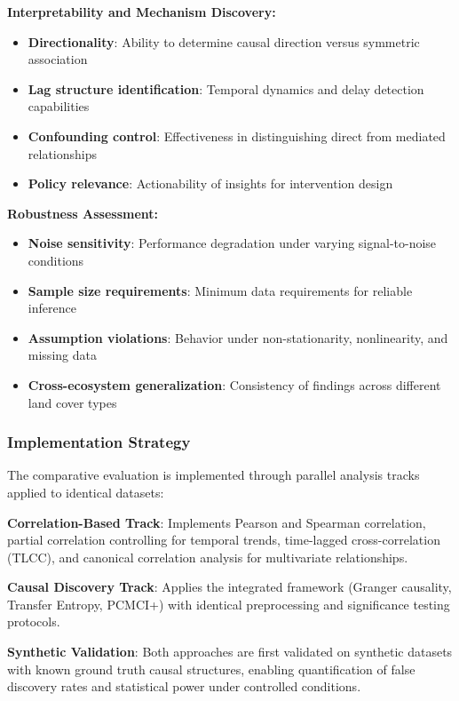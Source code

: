 \textbf{Interpretability and Mechanism Discovery:}
\begin{itemize}
	\item \textbf{Directionality}: Ability to determine causal direction versus symmetric association
	\item \textbf{Lag structure identification}: Temporal dynamics and delay detection capabilities
	\item \textbf{Confounding control}: Effectiveness in distinguishing direct from mediated relationships
	\item \textbf{Policy relevance}: Actionability of insights for intervention design
\end{itemize}

\textbf{Robustness Assessment:}
\begin{itemize}
	\item \textbf{Noise sensitivity}: Performance degradation under varying signal-to-noise conditions
	\item \textbf{Sample size requirements}: Minimum data requirements for reliable inference
	\item \textbf{Assumption violations}: Behavior under non-stationarity, nonlinearity, and missing data
	\item \textbf{Cross-ecosystem generalization}: Consistency of findings across different land cover types
\end{itemize}

\subsubsection{Implementation Strategy}

The comparative evaluation is implemented through parallel analysis tracks applied to identical datasets:

\textbf{Correlation-Based Track}: Implements Pearson and Spearman correlation, partial correlation controlling for temporal trends, time-lagged cross-correlation (TLCC), and canonical correlation analysis for multivariate relationships.

\textbf{Causal Discovery Track}: Applies the integrated framework (Granger causality, Transfer Entropy, PCMCI+) with identical preprocessing and significance testing protocols.

\textbf{Synthetic Validation}: Both approaches are first validated on synthetic datasets with known ground truth causal structures, enabling quantification of false discovery rates and statistical power under controlled conditions.


